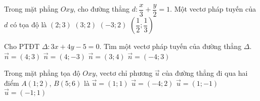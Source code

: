 

\begin{ex}%
	Trong mặt phẳng $Oxy$, cho đường thẳng $d\colon \dfrac{x}{3}+\dfrac{y}{2}=1$. Một vectơ pháp tuyến của $d$ có tọa độ là
	\choice
	{\True $(2;3)$}
	{$(3;2)$}
	{ $(-3;2)$}
	{$\left(\dfrac{1}{2};\dfrac{1}{3}\right)$}
\end{ex}


\begin{ex}%
	Cho PTĐT $\Delta \colon 3x+4y-5=0$. Tìm một vectơ pháp tuyến của đường thẳng $\Delta$.
	\choice
	{$\overrightarrow{n}=(4;3)$}
	{$\overrightarrow{n}=(4;-3)$}
	{\True $\overrightarrow{n}=(3;4)$}
	{$\overrightarrow{n}=(-4;3)$}
\end{ex}


\begin{ex}%
	Trong mặt phẳng tọa độ $Oxy$, vectơ chỉ phương $\overrightarrow{u}$ của đường thẳng đi qua hai điểm $A(1;2)$, $B(5;6)$ là
	\choice
	{\True $\overrightarrow{u}=(1;1)$}
	{$\overrightarrow{u}=(-4;2)$}
	{$\overrightarrow{u}=(1;-1)$}
	{$\overrightarrow{u}=(-1;1)$}
\end{ex}


